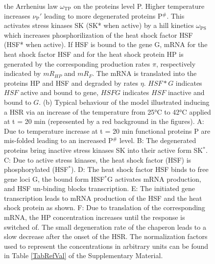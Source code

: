 \documentclass[oneside, 10pt, a4paper, twocolumn]{article}
\begin{document}
\begin{figure}
{{the Arrhenius law $\omega_\text{TP}$ on the proteins level P. 
Higher temperature increases $\nu_\text{P}'$ leading to more degenerated proteins P$^\#$. 
This activates stress kinases SK (SK* when active) by a hill kinetics $\omega_\text{PS}$ which increases phosphorilization of the heat shock factor HSF (HSF* when active). 
If HSF is bound to the gene G, mRNA for the heat shock factor HSF and for the heat shock protein HP is generated by the corresponding production rates $\pi$, respectively indicated by $mR_{HP}$ and $mR_{F}$. 
The mRNA is translated into the proteins HP and HSF and degraded by rates $\eta$. $HSF*G$ indicates $HSF$ active and bound to gene, $HSFG$ indicates $HSF$ inactive and bound to $G$. (b) Typical behaviour of the model illustrated inducing a HSR via an increase of the temperature from 25°C to 42°C applied at t = 20 min (represented by a red background in the figures). A: Due to temperature increase at t = 20 min functional proteins P are mis-folded leading to an increased P$^\#$ level. B: The degenerated proteins bring inactive stress kinases SK into their active form SK$^*$. C: Due to active stress kinases, the heat shock factor (HSF) is phosphorylated (HSF$^*$). D: The heat shock factor HSF binds to free gene loci G, the bound form HSF$^*$G activates mRNA production, and HSF un-binding blocks transcription. E: The initiated gene transcription leads to mRNA production of the HSF and the heat shock protein as shown. F: Due to translation of the corresponding mRNA, the HP concentration increases until the response is switched of. The small degeneration rate of the chaperon leads to a slow decrease after the onset of the HSR.
The normalization factors used to represent the concentrations in arbitrary units can be found in Table \ref{TabRefVal} of the Supplementary Material.}}
  \label{Fig1}
\end{figure}


\clearpage
\end{document}
